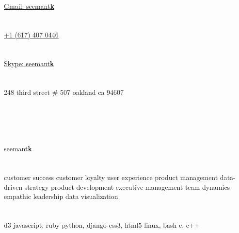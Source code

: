 \documentclass[]{friggeri-cv} %
\begin{document}

\begin{aside} %

\section{\scriptsize {}}
\href{mailto:seemantk@gmail.com}{Gmail: seemant\textbf{k}}
\section{\href{tel:617.407.0446}{\scriptsize {}}}
\href{tel:617.407.0446}{+1 (617) 407 0446}
\section{\scriptsize {}}
\href{skype:seemantk}{{\color{LightGray}Skype:} seemant\textbf{k}}
\section{{\scriptsize {}}}
248 third street
\# 507
oakland
ca 94607
\section{\href{http://www.github.com/seemantk}{{\scriptsize {}}} ~ \href{http://www.twitter.com/seemantk}{{\scriptsize {}}} ~ \href{http://www.linkedin.com/in/seemantk}{{\scriptsize {}}}}
seemant\textbf{k}
~
\section{{\scriptsize {} }}
customer success
customer loyalty
user experience
product management
data-driven strategy
product development
executive management
team dynamics
empathic leadership
data visualization
~
\section{{\scriptsize {}}}
{d3
javascript, ruby
python, django
css3, html5
linux, bash
c, c++}
\end{aside}
\end{document}

